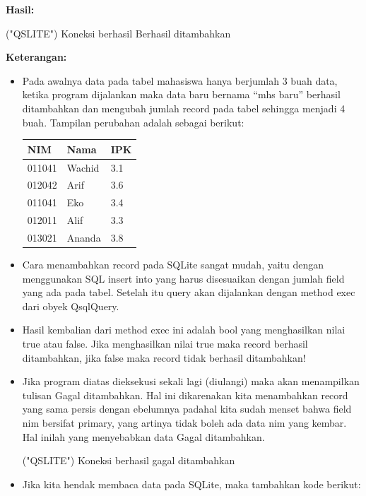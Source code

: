 \textbf{Hasil:}

\begin{lcverbatim}
("QSLITE")
Koneksi berhasil
Berhasil ditambahkan
\end{lcverbatim}

\textbf{Keterangan:}

\begin{itemize}
\item
  Pada awalnya data pada tabel mahasiswa hanya berjumlah 3 buah data,
  ketika program dijalankan maka data baru bernama ``mhs baru'' berhasil
  ditambahkan dan mengubah jumlah record pada tabel sehingga menjadi 4
  buah. Tampilan perubahan adalah sebagai berikut:
  
  \begin{tabular}{|l|l|l|}
  \hline
  NIM & Nama & IPK \\ \hline
  011041 & Wachid & 3.1 \\ \hline
  012042 & Arif & 3.6 \\ \hline
  011041 & Eko & 3.4 \\ \hline
  012011 & Alif & 3.3 \\ \hline
  013021 & Ananda & 3.8 \\ \hline
  
  \end{tabular}
\item
  Cara menambahkan record pada SQLite sangat mudah, yaitu dengan
  menggunakan SQL insert into yang harus disesuaikan dengan jumlah field
  yang ada pada tabel. Setelah itu query akan dijalankan dengan method
  exec dari obyek QsqlQuery.
\item
  Hasil kembalian dari method exec ini adalah bool yang menghasilkan
  nilai true atau false. Jika menghasilkan nilai true maka record
  berhasil ditambahkan, jika false maka record tidak berhasil
  ditambahkan!
\item
  Jika program diatas dieksekusi sekali lagi (diulangi) maka akan
  menampilkan tulisan Gagal ditambahkan. Hal ini dikarenakan kita
  menambahkan record yang sama persis dengan ebelumnya padahal kita
  sudah menset bahwa field nim bersifat primary, yang artinya tidak
  boleh ada data nim yang kembar. Hal inilah yang menyebabkan data Gagal
  ditambahkan.
  \begin{lcverbatim}
  ("QSLITE")
  Koneksi berhasil
  gagal  ditambahkan
\end{lcverbatim}

\item Jika kita hendak membaca data pada SQLite, maka tambahkan kode berikut:


\end{itemize}
